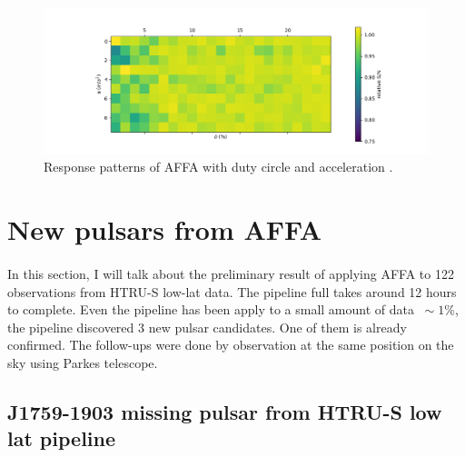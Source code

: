 \documentclass[thesis_msc.tex]{subfiles}
\begin{document}
\begin{figure}[h!]
\centering
\includegraphics[width=1.0\textwidth]{figures/a-d.png}
\caption{Response patterns of AFFA with duty circle and acceleration .}\label{a-d}
\end{figure}



	\section{New pulsars from AFFA}
  \paragraph{} In this section, I will talk about the preliminary result of applying AFFA to 122 observations from HTRU-S low-lat data. The pipeline full takes around 12 hours to complete. Even the pipeline has been apply to a small amount of data $~\sim 1 \%$, the pipeline discovered 3 new pulsar candidates. One of them is already confirmed. The follow-ups were done by observation at the same position on the sky using Parkes telescope. 

    \subsection{J1759-1903 missing pulsar from HTRU-S low lat pipeline }
\end{document}
